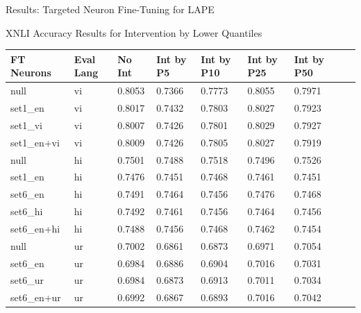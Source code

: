 \documentclass[aspectratio=169]{beamer}
\begin{document}
\begin{frame}{Results: Targeted Neuron Fine-Tuning for LAPE}
	\begin{block}{\scriptsize XNLI Accuracy Results for Intervention by Lower Quantiles}\scriptsize
		\begin{table}[ht]
			\centering
			\renewcommand{\arraystretch}{1.3}
			\setlength{\tabcolsep}{4pt}
			\begin{tabularx}{\textwidth}{|X|X|X|X|X|X|X|X|X|}
				\hline
				\textbf{FT Neurons} & \textbf{Eval Lang} & \textbf{No Int} & \textbf{Int by P5} & \textbf{Int by P10} & \textbf{Int by P25} & \textbf{Int by P50} \\
				\hline
				null & vi & 0.8053 & 0.7366 & 0.7773 & 0.8055 & 0.7971 \\
				set1\_en & vi & 0.8017 & 0.7432 & 0.7803 & 0.8027 & 0.7923 \\
				set1\_vi & vi & 0.8007 & 0.7426 & 0.7801 & 0.8029 & 0.7927 \\
				set1\_en+vi & vi & 0.8009 & 0.7426 & 0.7805 & 0.8027 & 0.7919 \\
				\hline
				null & hi & 0.7501 & 0.7488 & 0.7518 & 0.7496 & 0.7526 \\
				set1\_en & hi & 0.7476 & 0.7451 & 0.7468 & 0.7461 & 0.7451 \\
				set6\_en & hi & 0.7491 & 0.7464 & 0.7456 & 0.7476 & 0.7468 \\
				set6\_hi & hi & 0.7492 & 0.7461 & 0.7456 & 0.7464 & 0.7456 \\
				set6\_en+hi & hi & 0.7488 & 0.7456 & 0.7468 & 0.7462 & 0.7454 \\
				\hline
				null & ur & 0.7002 & 0.6861 & 0.6873 & 0.6971 & 0.7054 \\
				set6\_en & ur & 0.6984 & 0.6886 & 0.6904 & 0.7016 & 0.7031 \\
				set6\_ur & ur & 0.6984 & 0.6873 & 0.6913 & 0.7011 & 0.7034 \\
				set6\_en+ur & ur & 0.6992 & 0.6867 & 0.6893 & 0.7016 & 0.7042 \\
				\hline
			\end{tabularx}
		\end{table}
	\end{block}
\end{frame}
	
\end{document}
